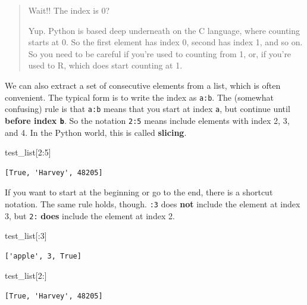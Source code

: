 \documentclass[
  letterpaper,
]{scrbook}
\newenvironment{Shaded}{\begin{snugshade}}{\end{snugshade}}
\newcommand{\DecValTok}[1]{\textcolor[rgb]{0.00,0.00,0.81}{#1}}
\newcommand{\NormalTok}[1]{#1}
\begin{document}
\begin{quote}
Wait!! The index is 0?

Yup. Python is based deep underneath on the C language, where counting starts at 0. So the first element has index 0, second has index 1, and so on. So you need to be careful if you're used to counting from 1, or, if you're used to R, which does start counting at 1.
\end{quote}

We can also extract a set of consecutive elements from a list, which is often convenient. The typical form is to write the index as \texttt{a:b}. The (somewhat confusing) rule is that \texttt{a:b} means that you start at index \texttt{a}, but continue until \textbf{before index \texttt{b}}. So the notation \texttt{2:5} means include elements with index 2, 3, and 4. In the Python world, this is called \textbf{slicing}.

\begin{Shaded}
\begin{Highlighting}[]
\NormalTok{test_list[}\DecValTok{2}\NormalTok{:}\DecValTok{5}\NormalTok{]}
\end{Highlighting}
\end{Shaded}

\begin{verbatim}
[True, 'Harvey', 48205]
\end{verbatim}

If you want to start at the beginning or go to the end, there is a shortcut notation. The same rule holds, though. \texttt{:3} does \textbf{not} include the element at index 3, but \texttt{2:} \textbf{does} include the element at index 2.

\begin{Shaded}
\begin{Highlighting}[]
\NormalTok{test_list[:}\DecValTok{3}\NormalTok{]}
\end{Highlighting}
\end{Shaded}

\begin{verbatim}
['apple', 3, True]
\end{verbatim}

\begin{Shaded}
\begin{Highlighting}[]
\NormalTok{test_list[}\DecValTok{2}\NormalTok{:]}
\end{Highlighting}
\end{Shaded}

\begin{verbatim}
[True, 'Harvey', 48205]
\end{verbatim}
\end{document}

